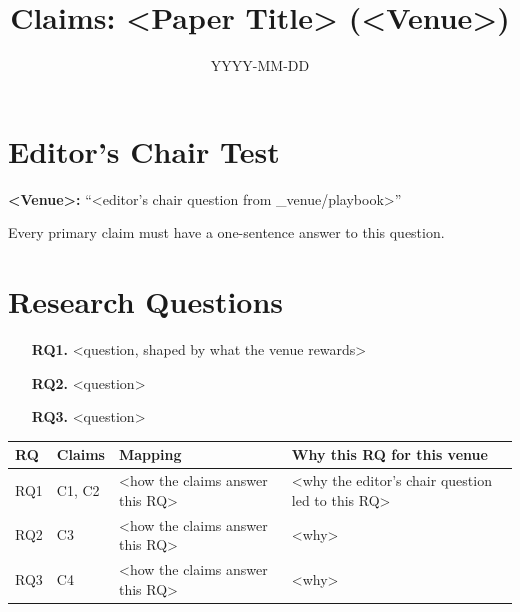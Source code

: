 \documentclass[11pt]{article}
\title{Claims: <Paper Title> (<Venue>)}
\date{YYYY-MM-DD}
\begin{document}
\maketitle

\section*{Editor's Chair Test}

\textbf{<Venue>:} ``<editor's chair question from _venue/playbook>''

Every primary claim must have a one-sentence answer to this question.

\section*{Research Questions}

\begin{enumerate}
\item[\textbf{RQ1.}] <question, shaped by what the venue rewards>
\item[\textbf{RQ2.}] <question>
\item[\textbf{RQ3.}] <question>
\end{enumerate}

\bigskip

\begin{small}
\begin{tabularx}{\textwidth}{@{}p{}p{}X p{}@{}}
\toprule
RQ & Claims & Mapping & Why this RQ for this venue \\
\midrule
RQ1 & C1, C2 & <how the claims answer this RQ> & <why the editor's chair question led to this RQ> \\
RQ2 & C3     & <how the claims answer this RQ> & <why> \\
RQ3 & C4     & <how the claims answer this RQ> & <why> \\
\bottomrule
\end{tabularx}
\end{small}
\end{document}
